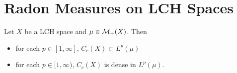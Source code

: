 \documentclass{book}
\begin{document}
	
	
	
	
	
	
	
	
	
	
	
	
	
	
	
	
	
	
	
	
	
	
	
	
	
	
	
	
	
	
	
	
	
	
	
	
	
	
	
	
	
	
	
	
	
	
	
	
	
	
	
	
	
	
	
	
	
	
	
	
	
	
	
	
	
	
	
	
	
	\newpage	
	\section{Radon Measures on LCH Spaces}
	
	
	\begin{ex}  
		Let $X$ be a LCH space and $\mu \in \mathcal{M}_+(X)$. Then 
		\begin{itemize}
			\item for each $p \in [1, \infty]$, $C_c(X) \subset L^p(\mu)$
			\item for each $p \in [1, \infty)$, $C_c(X)$ is dense in $L^p(\mu)$.
		\end{itemize}
	\end{ex}
	
\end{document}
